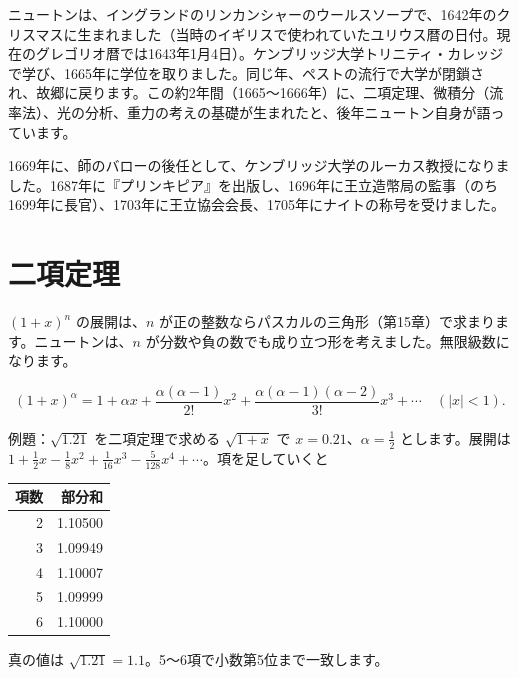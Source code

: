 \documentclass[a4paper,11pt,openany]{ltjsbook}
\begin{document}
ニュートンは、イングランドのリンカンシャーのウールスソープで、1642年のクリスマスに生まれました（当時のイギリスで使われていたユリウス暦の日付。現在のグレゴリオ暦では1643年1月4日）。ケンブリッジ大学トリニティ・カレッジで学び、1665年に学位を取りました。同じ年、ペストの流行で大学が閉鎖され、故郷に戻ります。この約2年間（1665〜1666年）に、二項定理、微積分（流率法）、光の分析、重力の考えの基礎が生まれたと、後年ニュートン自身が語っています。

1669年に、師のバローの後任として、ケンブリッジ大学のルーカス教授になりました。1687年に『プリンキピア』を出版し、1696年に王立造幣局の監事（のち1699年に長官）、1703年に王立協会会長、1705年にナイトの称号を受けました。

\section{二項定理}

$(1+x)^n$ の展開は、$n$ が正の整数ならパスカルの三角形（第15章）で求まります。ニュートンは、$n$ が分数や負の数でも成り立つ形を考えました。無限級数になります。

\[
(1+x)^{\alpha}=1+\alpha x+\frac{\alpha(\alpha-1)}{2!}x^2+\frac{\alpha(\alpha-1)(\alpha-2)}{3!}x^3+\cdots\quad(|x|<1).
\]

\begin{examplebox}{例題：$\sqrt{1.21}$ を二項定理で求める}
$\sqrt{1+x}$ で $x=0.21$、$\alpha=\tfrac12$ とします。展開は $1+\tfrac12x-\tfrac18x^2+\tfrac1{16}x^3-\tfrac5{128}x^4+\cdots$。項を足していくと

\begin{center}
\begin{tabular}{rr}
\toprule
項数 & 部分和\\
\midrule
2 & 1.10500\\
3 & 1.09949\\
4 & 1.10007\\
5 & 1.09999\\
6 & 1.10000\\
\bottomrule
\end{tabular}
\end{center}

真の値は $\sqrt{1.21}=1.1$。5〜6項で小数第5位まで一致します。
\end{examplebox}
\end{document}
